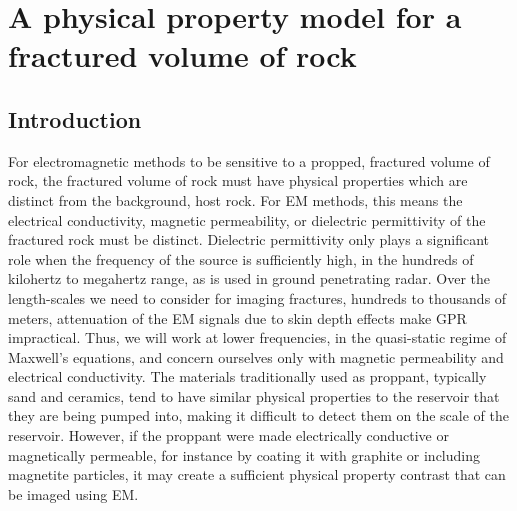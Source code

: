 
\chapter{A physical property model for a fractured volume of rock}
\label{ch:phys-prop-model}

\section{Introduction}
For electromagnetic methods to be sensitive to a propped, fractured volume of rock, the fractured volume of rock must have physical properties which are distinct from the background, host rock. For EM methods, this means the electrical conductivity, magnetic permeability, or dielectric permittivity of the fractured rock must be distinct. Dielectric permittivity only plays a significant role when the frequency of the source is sufficiently high, in the hundreds of kilohertz to megahertz range, as is used in ground penetrating radar. Over the length-scales we need to consider for imaging fractures, hundreds to thousands of meters, attenuation of the EM signals due to skin depth effects make GPR impractical. Thus, we will work at lower frequencies, in the quasi-static regime of Maxwell's equations, and concern ourselves only with magnetic permeability and electrical conductivity. The materials traditionally used as proppant, typically sand and ceramics, tend to have similar physical properties to the reservoir that they are being pumped into, making it difficult to detect them on the scale of the reservoir. However, if the proppant were made electrically conductive or magnetically permeable, for instance by coating it with graphite or including magnetite particles, it may create a sufficient physical property contrast that can be imaged using EM.

